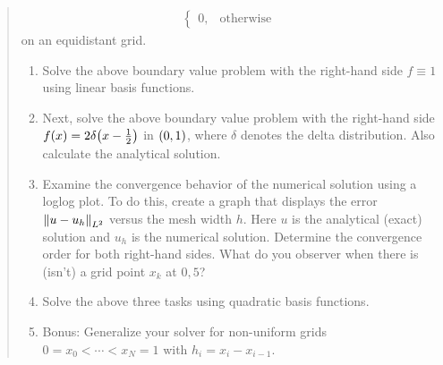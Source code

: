 \documentclass[english]{exercise}
\begin{document}
\begin{quote}
\begin{align*}
\begin{cases}
                0, & \text{otherwise}
            \end{cases}
        \end{align*}
        on an equidistant grid.
        \begin{enumerate}
            \item Solve the above boundary value problem with the right-hand side \(f \equiv 1\) using linear basis functions.
            \item Next, solve the above boundary value problem with the right-hand side \(f\parentheses*{x} = 2\delta\parentheses*{x - \frac{1}{2}}\) in \(\parentheses*{0, 1}\), where \(\delta\) denotes the delta distribution.
            Also calculate the analytical solution.
            \item Examine the convergence behavior of the numerical solution using a loglog plot.
            To do this, create a graph that displays the error \(\norm*{u - u_h}_{L^2}\) versus the mesh width \(h\).
            Here \(u\) is the analytical (exact) solution and \(u_h\) is the numerical solution.
            Determine the convergence order for both right-hand sides.
            What do you observer when there is (isn't) a grid point \(x_k\) at \(0,5\)?
            \item Solve the above three tasks using quadratic basis functions.
            \item Bonus: Generalize your solver for non-uniform grids \(0 = x_0 < \cdots < x_N = 1\) with \(h_i = x_i - x_{i - 1}\).
        \end{enumerate}
    \end{quote}
\end{document}
